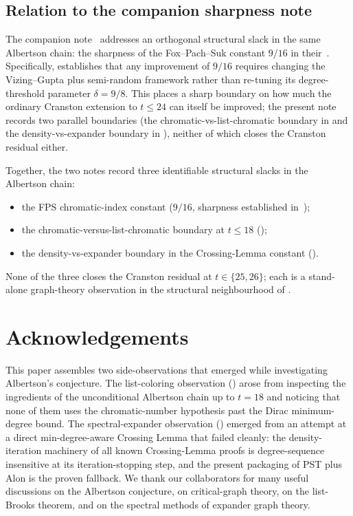 \documentclass[11pt,a4paper]{article}
\theoremstyle{definition}
\begin{document}
\subsection{Relation to the companion sharpness note}\label{ssec:bundle}

The companion note~\cite{D8} addresses an orthogonal structural
slack in the same Albertson chain: the sharpness of the
Fox--Pach--Suk constant $9/16$ in their~\cite[Lemma~2.3]{FPS}.
Specifically, \cite{D8} establishes that any improvement of $9/16$
requires changing the Vizing--Gupta plus semi-random framework
rather than re-tuning its degree-threshold parameter $\delta = 9/8$.
This places a sharp boundary on how much the ordinary Cranston
extension to $t \le 24$ can itself be improved; the present note
records two parallel boundaries (the chromatic-vs-list-chromatic
boundary in  and the
density-vs-expander boundary in ),
neither of which closes the Cranston residual either.

Together, the two notes record three identifiable structural
slacks in the Albertson chain:
\begin{itemize}
\item the FPS chromatic-index constant ($9/16$, sharpness
  established in~\cite{D8});
\item the chromatic-versus-list-chromatic boundary at $t \le 18$
  ();
\item the density-vs-expander boundary in the Crossing-Lemma
  constant ().
\end{itemize}
None of the three closes the Cranston residual at
$t \in \{25, 26\}$; each is a stand-alone graph-theory observation
in the structural neighbourhood of .

\section*{Acknowledgements}

This paper assembles two side-observations that emerged while
investigating Albertson's conjecture. The list-coloring
observation () arose from inspecting the
ingredients of the unconditional Albertson chain up to $t = 18$
and noticing that none of them uses the chromatic-number
hypothesis past the Dirac minimum-degree bound. The
spectral-expander observation () emerged
from an attempt at a direct min-degree-aware Crossing Lemma that
failed cleanly: the density-iteration machinery of all known
Crossing-Lemma proofs is degree-sequence insensitive at its
iteration-stopping step, and the present packaging of PST plus
Alon is the proven fallback. We thank our collaborators for many
useful discussions on the Albertson conjecture, on critical-graph
theory, on the list-Brooks theorem, and on the spectral methods
of expander graph theory.
\end{document}
